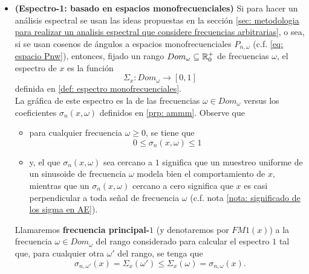 \begin{itemize}
	\item \textbf{(Espectro-1: basado en espacios monofrecuenciales)} 
	Si para hacer un análisis espectral se usan
	las ideas propuestas en 
	la sección
	\ref{sec: metodologia para realizar un analisis espectral que considere frecuencias arbitrarias}, 
	o sea, si se usan cosenos de ángulos a
	espacios monofrecuenciales $P_{n, \omega}$
	(c.f. \ref{eq: espacio Pnw}),	
	entonces, fijado un rango
	$Dom_{\omega} \subseteq \mathbb{R}^{+}_{0}$	
	de frecuencias $\omega$,
	el espectro de $x$ es 
	la función 
	\[
	\Sigma_{x} : Dom_{\omega} \longrightarrow [0,1]
	\]
	definida en \eqref{def: espectro monofrecuenciales}. \\
	
	La gráfica de este espectro es la de 
	las frecuencias $\omega \in Dom_{\omega}$ versus	
	los coeficientes
	$\sigma_{n}(x, \omega)$ definidos en 
	\ref{prp: ammm}. Observe que
	\begin{itemize}
		\item para cualquier frecuencia $\omega \geq 0$, se tiene que
		\[
		0 \leq \sigma_{n}(x, \omega) \leq 1
		\]
		\item 
	y, el que
	$\sigma_{n}(x, \omega)$ sea cercano a $1$ significa que un
	muestreo uniforme de un sinusoide de frecuencia $\omega$
	modela bien el comportamiento de $x$,
	mientras que un $\sigma_{n}(x, \omega)$ cercano
	a cero significa que 
	$x$ es casi perpendicular a toda señal de frecuencia $\omega$
	(c.f. nota \ref{nota: significado de los sigma en AE}).
	\end{itemize}
	\begin{defi}
	\label{def: FM1}
	Llamaremos \textbf{frecuencia principal-$1$}
	(y denotaremos
	por $FM1(x)$) a la frecuencia $\omega \in Dom_{\omega}$ 
	del rango considerado para calcular el espectro $1$
	tal que, para cualquier otra $\omega'$ del rango, se tenga que
	\[
	\sigma_{n, \omega'}(x) = \Sigma_{x}(\omega') 
	\leq \Sigma_{x}(\omega) = \sigma_{n, \omega}(x).
	\]
	\end{defi}
\end{itemize}

